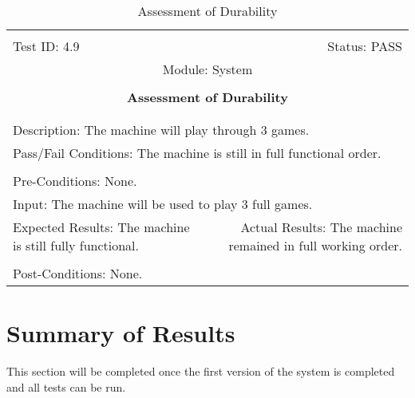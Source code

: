 \documentclass[titlepage]{article}
\begin{document}
\begin{center}
\begin{table}[h!]
\begin{tabular}{|l r|}\hline&\\[-2mm]
	Test ID: 4.9	&Status: PASS\\[-3mm]
	\multicolumn{2}{|c|}{Module: System}\\&\\
	\multicolumn{2}{|c|}{\textbf{\large{Assessment of Durability}}}\\&\\\hline&\\[-3mm]
	\multicolumn{2}{|p{\textwidth}|}{Description: The machine will play through 3 games.}\\\hline
	\multicolumn{2}{|p{\textwidth}|}{Pass/Fail Conditions: The machine is still in full functional order.}\\[1mm]\hline&\\[-3mm]
	\multicolumn{2}{|p{\textwidth}|}{Pre-Conditions: None.}\\[4mm]
	\multicolumn{2}{|p{\textwidth}|}{Input: The machine will be used to play 3 full games.}\\[2mm]\hline
	\multicolumn{1}{|p{0.49\textwidth}}{Expected Results: The machine is still fully functional.}	&\multicolumn{1}{|p{0.45\textwidth}|}{Actual Results: The machine remained in full working order.}\\\hline&\\[-3mm]
	\multicolumn{2}{|p{\textwidth}|}{Post-Conditions: None.}\\\hline
\end{tabular}
\caption{Assessment of Durability}
\end{table}
\end{center}




\section{Summary of Results}
This section will be completed once the first version of the system is completed and all tests can be run.
\end{document}
